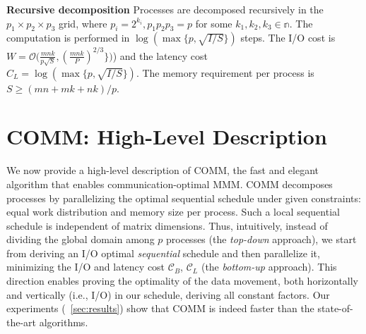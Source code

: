 \documentclass[sigplan,review,anonymous]{acmart}\settopmatter{printfolios=true,printccs=false,printacmref=false}
\newcommand\mac[1]{\textcolor{red}{[Mac: #1]}}
\newcommand{\macb}[1]{\textbf{\textsf{#1}}}
\begin{document}
\macb{Recursive decomposition}
%
Processes are decomposed recursively in the $p_1 \times p_2 \times p_3$ grid,
where $p_i = 2^{k_i}, p_1 p_2 p_3 = p$ for some $k_1, k_2, k_3 \in \mathbb{n}$.
The computation is performed in $\log (\max \{p,\sqrt{I/S} \})$ steps.  The
I/O cost is $W = \mathcal{O}\Big(\frac{mnk}{p\sqrt{S}},
\left(\frac{mnk}{P}\right)^{2/3} \Big\} \Big)$) and the latency cost \\ 
$C_L
= \log (\max \{p,\sqrt{I/S} \})$. The memory requirement per process is $S \ge
(mn + mk + nk)/p$. 

\section{COMM: High-Level Description}
%
%

We now provide a high-level description of COMM, the fast and elegant algorithm 
that
enables communication-optimal MMM.
COMM  decomposes processes by
parallelizing the optimal sequential schedule under given constraints: equal
work distribution and memory size per process. Such
a local sequential schedule is independent of matrix dimensions.
Thus, intuitively, instead of dividing  the global
domain among $p$ processes (the \emph{top-down} approach), we start from 
deriving an I/O optimal \emph{sequential} schedule and
then parallelize it, minimizing the I/O and latency cost $\mathcal{C}_B$,
$\mathcal{C}_L$ (the \emph{bottom-up} approach). This direction enables proving 
the optimality of the data movement, both
horizontally and vertically (i.e., I/O) in our
schedule, deriving all constant factors. Our experiments (~\cref{sec:results}) 
show that COMM is indeed faster than the
state-of-the-art algorithms.
\end{document}
